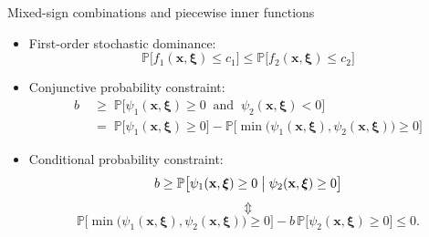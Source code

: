 \documentclass[aspectratio=169,xcolor=dvipsnames]{beamer}
\begin{document}
\begin{frame}{Mixed-sign combinations and piecewise inner functions}
  \small
  \setlength{\abovedisplayskip}{4pt}
  \setlength{\belowdisplayskip}{4pt}
  \setlength{\abovedisplayshortskip}{3pt}
  \setlength{\belowdisplayshortskip}{3pt}

  \begin{itemize}
    \setlength{\itemsep}{0.16cm}
    \item First-order stochastic dominance:
      \[
        \mathbb{P}\bigl[f_1(\mathbf{x},\boldsymbol{\xi})\leq c_1\bigr]
        \leq
        \mathbb{P}\bigl[f_2(\mathbf{x},\boldsymbol{\xi})\leq c_2\bigr]
      \]
    \item Conjunctive probability constraint:
      \begin{align*}
        b\;&\geq\;\mathbb{P}\bigl[\psi_1(\mathbf{x},\boldsymbol{\xi})\geq 0
          \ \text{ and }\ \psi_2(\mathbf{x},\boldsymbol{\xi})<0\bigr]\\
        &=\;\mathbb{P}\bigl[\psi_1(\mathbf{x},\boldsymbol{\xi})\geq 0\bigr]
          -\mathbb{P}\bigl[\min\bigl(\psi_1(\mathbf{x},\boldsymbol{\xi}),
          \psi_2(\mathbf{x},\boldsymbol{\xi})\bigr)\geq 0\bigr]
      \end{align*}
    \item Conditional probability constraint:
      \vspace{-0.06cm}
      \[
        b\geq\mathbb{P}\bigl[\psi_1(\mathbf{x},\boldsymbol{\xi})\geq 0
          \bigm|\psi_2(\mathbf{x},\boldsymbol{\xi})\geq 0\bigr]
      \]
      \vspace{-0.42cm}
      \[
        \Updownarrow
      \]
      \vspace{-0.42cm}
      \[
        \mathbb{P}\bigl[\min\bigl(\psi_1(\mathbf{x},\boldsymbol{\xi}),
          \psi_2(\mathbf{x},\boldsymbol{\xi})\bigr)\geq 0\bigr]
        -b\,\mathbb{P}\bigl[\psi_2(\mathbf{x},\boldsymbol{\xi})\geq 0\bigr]
        \leq 0.
      \]
  \end{itemize}
\end{frame}
\end{document}
